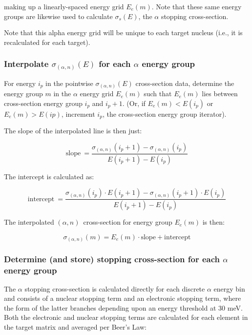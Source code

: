 \documentclass[10pt]{article}
\newcommand{\alphn}[0]{$\left(\alpha,n\right)$}
\newcommand{\sigan}[0]{\sigma_{\left(\alpha,n\right)}}
\begin{document}
making up a linearly-spaced energy grid $E_e\left(m\right)$. Note that these same energy groups are likewise used to calculate $\sigma_{s}\left(E\right)$, the $\alpha$ stopping cross-section. 

Note that this alpha energy grid will be unique to each target nucleus (i.e., it is recalculated for each target).

\subsubsection{Interpolate $\sigan\left(E\right)$ for each $\alpha$ energy group}

For energy $i_p$ in the pointwise $\sigan\left(E\right)$ cross-section data, determine the energy group $m$ in the $\alpha$ energy grid $E_e\left(m\right)$ such that $E_e\left(m\right)$ lies between cross-section energy group $i_p$ and $i_p+1$. (Or, if $E_e\left(m\right) < E\left(i_p\right)$ or $E_e\left(m\right) > E\left(ip\right)$, increment $i_p$, the cross-section energy group iterator). 

The slope of the interpolated line is then just:

\begin{equation}
\mathrm{slope}\ = \frac{ \sigan\left(i_p+1\right) - \sigan\left(i_p\right) }{ E\left(i_p+1\right) - E\left(i_p\right) }
\end{equation}

The intercept is calculated as:

\begin{equation}
\mathrm{intercept}\ = \frac{ \sigan\left(i_p \right) \cdot E\left(i_p+1\right) - \sigan\left(i_p+1\right) \cdot E\left(i_p\right) } { E\left(i_p+1\right) - E\left(i_p\right)}
\end{equation}

The interpolated \alphn\ cross-section for energy group $E_e\left(m\right)$ is then:

\begin{equation}
\sigan\left(m\right) = E_e\left(m\right) \cdot \mathrm{slope} + \mathrm{intercept}
\end{equation}

\subsubsection{Determine (and store) stopping cross-section for each $\alpha$ energy group}

The $\alpha$ stopping cross-section is calculated directly for each discrete $\alpha$ energy bin and consists of a nuclear stopping term and an electronic stopping term, where the form of the latter branches depending upon an energy threshold at 30 meV. Both the electronic and nuclear stopping terms are calculated for each element in the target matrix and averaged per Beer's Law:
\end{document}
